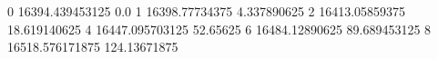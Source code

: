0 16394.439453125 0.0
1 16398.77734375 4.337890625
2 16413.05859375 18.619140625
4 16447.095703125 52.65625
6 16484.12890625 89.689453125
8 16518.576171875 124.13671875
